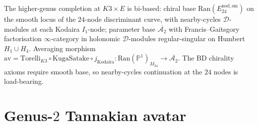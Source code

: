 \begin{remark}
\label{rem:genus-complete-bi-based}
The higher-genus completion at $K3 \times E$ is bi-based: chiral base
$\mathrm{Ran}(E^{\mathrm{nod,sm}}_{24})$ on the smooth locus of the $24$-node
discriminant curve, with nearby-cycles $\mathcal{D}$-modules at each Kodaira $I_1$-node;
parameter base $\overline{\mathcal{A}_2}$ with Francis--Gaitsgory factorisation
$\infty$-category in holonomic $\mathcal{D}$-modules regular-singular on Humbert
$H_1 \cup H_4$. Averaging morphism
$\mathrm{av} = \mathrm{Torelli}_{K3} \circ \mathrm{KugaSatake} \circ j_{\mathrm{Kodaira}}
\colon \mathrm{Ran}(\mathbb{P}^1)_{M_{24}} \to \overline{\mathcal{A}_2}$. The BD chirality
axioms require smooth base, so nearby-cycles continuation at the $24$ nodes is
load-bearing.
\end{remark}

\section{Genus-$2$ Tannakian avatar}
\label{sec:genus-complete-supplement-ii}

